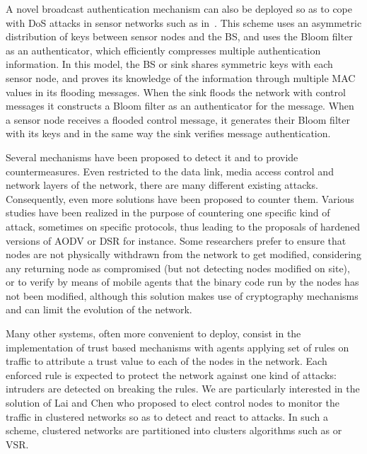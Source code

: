 A novel broadcast authentication mechanism can also be deployed so as to cope with DoS attacks in sensor networks such as in~\cite{SLS10}.
This scheme uses an asymmetric distribution of keys between sensor nodes and the BS, and uses the Bloom filter as an authenticator, which efficiently compresses multiple authentication information.
In this model, the BS or sink shares symmetric keys with each sensor node, and proves its knowledge of the information through multiple MAC values in its flooding messages.
When the sink floods the network with control messages it constructs a Bloom filter as an authenticator for the message.
When a sensor node receives a flooded control message, it generates their Bloom filter with its keys and in the same way the sink verifies message authentication.




Several mechanisms have been proposed to detect it and to provide countermeasures\cite{SSS11,RM11}.
Even restricted to the data link, media access control and network layers of the network, there are many different existing \DoS attacks.
Consequently, even more solutions have been proposed to counter them.
Various studies have been realized in the purpose of countering one specific kind of attack, sometimes on specific protocols, thus leading to the proposals of hardened versions of AODV\cite{DLA02} or DSR\cite{CT04} for instance.
Some researchers prefer to ensure that nodes are not physically withdrawn from the network to get modified\cite{Ho10}, considering any returning node as compromised (but not detecting nodes modified on site), or to verify by means of mobile agents that the binary code run by the nodes has not been modified\cite{HR13}, although this solution makes use of cryptography mechanisms and can limit the evolution of the network.

Many other systems, often more convenient to deploy, consist in the implementation of trust based mechanisms\cite{MC10,F-GRL07} with agents applying set of rules\cite{RKKK13} on traffic to attribute a trust value to each of the nodes in the network.
Each enforced rule is expected to protect the network against one kind of attacks: intruders are detected on breaking the rules.
We are particularly interested in the solution of Lai and Chen\cite{LC08} who proposed to elect control nodes to monitor the traffic in clustered networks so as to detect and react to \dos attacks.
In such a scheme, clustered networks are partitioned into clusters \via algorithms such as \leach\cite{HHT02} or VSR\cite{TV08}.





